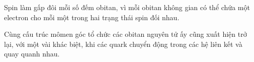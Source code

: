 Spin làm gấp đôi mỗi số đếm obitan, vì mỗi obitan không gian có thể chứa một electron cho mỗi một trong hai trạng thái spin đối nhau.

\begin{classroomqa}
\end{classroomqa}

Cùng cấu trúc mômen góc tổ chức các obitan nguyên tử ấy cũng xuất hiện trở lại, với một vài khác biệt, khi các quark chuyển động trong các hệ liên kết và quay quanh nhau.